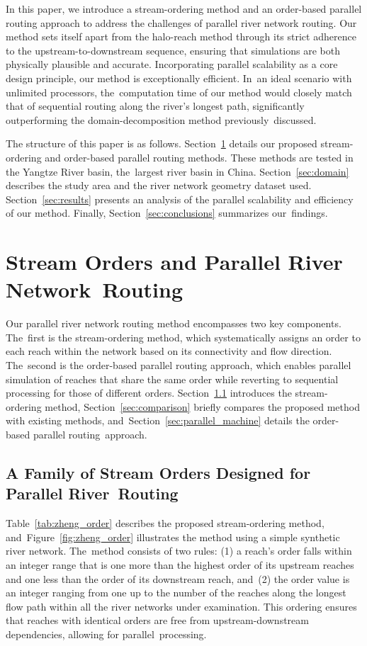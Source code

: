 \documentclass[water,article,accept,pdftex,moreauthors]{Definitions/mdpi}
\begin{document}
In this paper, we introduce a stream-ordering method and an order-based parallel routing approach to address the challenges of parallel river network routing. Our method sets itself apart from the halo-reach method through its strict adherence to the upstream-to-downstream sequence, ensuring that simulations are both physically plausible and accurate. Incorporating parallel scalability as a core design principle, our method is exceptionally efficient. In~an ideal scenario with unlimited processors, the~computation time of our method would closely match that of sequential routing along the river's longest path, significantly outperforming the domain-decomposition method previously~discussed.

The structure of this paper is as follows. Section~\ref{sec:methods} details our proposed stream-ordering and order-based parallel routing methods. These methods are tested in the Yangtze River basin, the~largest river basin in China. Section~\ref{sec:domain} describes the study area and the river network geometry dataset used. Section~\ref{sec:results} presents an analysis of the parallel scalability and efficiency of our method. Finally, Section~\ref{sec:conclusions} summarizes our~findings.

\section{Stream Orders and Parallel River Network~Routing}
\label{sec:methods}

Our parallel river network routing method encompasses two key components. The~first is the stream-ordering method, which systematically assigns an order to each reach within the network based on its connectivity and flow direction. The~second is the order-based parallel routing approach, which enables parallel simulation of reaches that share the same order while reverting to sequential processing for those of different orders. Section~\ref{sec:stream_order} introduces the stream-ordering method, Section~\ref{sec:comparison} briefly compares the proposed method with existing methods, and~Section~\ref{sec:parallel_machine} details the order-based parallel routing~approach.

\subsection{A Family of Stream Orders Designed for Parallel River~Routing}
\label{sec:stream_order}

Table~\ref{tab:zheng_order} describes the proposed stream-ordering method, and~Figure~\ref{fig:zheng_order} illustrates the method using a simple synthetic river network. The~method consists of two rules: (1) a reach's order falls within an integer range that is one more than the highest order of its upstream reaches and one less than the order of its downstream reach, and~(2) the order value is an integer ranging from one up to the number of the reaches along the longest flow path within all the river networks under examination. This ordering ensures that reaches with identical orders are free from upstream-downstream dependencies, allowing for parallel~processing.
\end{document}
